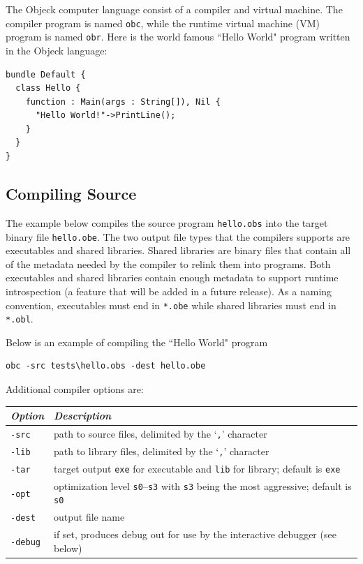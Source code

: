 \documentclass[12pt]{article}
\begin{document}
The Objeck computer language consist of a compiler and virtual machine.  The compiler program is named \texttt{obc}, while the runtime virtual machine (VM) program is named \texttt{obr}.  Here is the world famous ``Hello World" program written in the Objeck language:

\begin{verbatim}
bundle Default {
  class Hello {
    function : Main(args : String[]), Nil {
      "Hello World!"->PrintLine();
    }
  }
}
\end{verbatim}

\subsection{Compiling Source}
The example below compiles the source program \texttt{hello.obs} into the target binary file \texttt{hello.obe}.  The two output file types that the compilers supports are executables and shared libraries.  Shared libraries are binary files that contain all of the metadata needed by the compiler to relink them into programs.  Both executables and shared libraries contain enough metadata to support runtime introspection (a feature that will be added in a future release).  As a naming convention, executables must end in \texttt{*.obe} while shared libraries must end in \texttt{*.obl}.

Below is an example of compiling the ``Hello World" program
\begin{verbatim}
obc -src tests\hello.obs -dest hello.obe
\end{verbatim}

Additional compiler options are:
\begin{center}
\begin{tabular}{| l | l |}
\hline
\emph{Option} & \emph{Description} \\ \hline \hline
\texttt{-src} & path to source files, delimited by the `\texttt{,}' character \\ \hline
\texttt{-lib} & path to library files, delimited by the `\texttt{,}' character \\ \hline
\texttt{-tar} & target output \texttt{exe} for executable and \texttt{lib} for library; default is  \texttt{exe} \\ \hline
\texttt{-opt} & optimization level \texttt{s0}--\texttt{s3} with \texttt{s3} being the most aggressive; default is \texttt{s0} \\ \hline
\texttt{-dest} & output file name \\ \hline
\texttt{-debug} & if set, produces debug out for use by the interactive debugger (see below) \\ \hline
\end{tabular}
\end{center}
\end{document}
